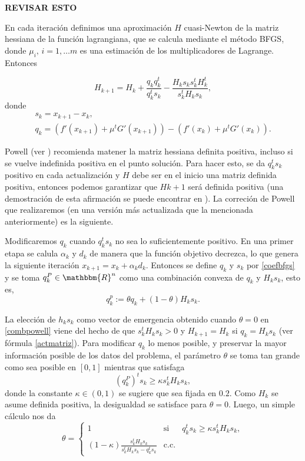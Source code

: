 \documentclass[a4paper,10pt]{book}
\newcommand{\R}{\mathbbm{R}}
\newcommand{\Rn}{\R^n}
\begin{document}
\textbf{REVISAR ESTO}

En cada iteración definimos una aproximación $H$ cuasi-Newton de la matriz hessiana de la función lagrangiana, que se calcula mediante el método BFGS, donde $\mu_i,\,i=1,\ldots m$ es una estimación de los multiplicadores de Lagrange. Entonces

\begin{equation}\label{actmatriz}
    H_{k+1}=H_k+\frac{q_kq_k^t}{q_k^ts_k}-\frac{H_ks_ks_k^tH_k^t}{s_k^tH_ks_k},
\end{equation}
donde 
\begin{equation}\label{coefbfgs}
    \begin{array}{c}
    s_k=x_{k+1}-x_k,\\
    q_k=\left(f'(x_{k+1})+\mu^tG'(x_{k+1})\right)-\left( f'(x_k)+\mu^tG'(x_k)\right).
    \end{array}
\end{equation}

Powell (ver \cite{powell1978fast}) recomienda matener la matriz hessiana definita positiva, incluso si se vuelve indefinida positiva en el punto solución. Para hacer esto, se da $q_k^ts_k$ positivo en cada actualización y $H$ debe ser en el inicio una matriz definida positiva, entonces podemos garantizar que $H{k+1}$ será definida positiva (una demostración de esta afirmación se puede encontrar en \cite[Theorem 4.5.]{bonnans2006numerical}). La correción de Powell que realizaremos (en una versión más actualizada que la mencionada anteriormente) es la siguiente.

Modificaremos $q_k$ cuando $q_k^ts_k$ no sea lo suficientemente positivo. En una primer etapa se calula $\alpha_k$ y $d_k$ de manera que la función objetivo decrezca, lo que genera la siguiente iteración $x_{k+1}=x_k+\alpha_kd_k$. Entonces se define $q_k$ y $s_k$ por \eqref{coefbfgs} y se toma $q_k^P\in\Rn$ como una combinación convexa de $q_k$ y $H_ks_k$, esto es,
\begin{equation}\label{combpowell}
    q_k^p:=\theta q_k+(1-\theta)H_ks_k.
\end{equation}

La elección de $h_ks_k$ como vector de emergencia obtenido cuando $\theta=0$ en \eqref{combpowell} viene del hecho de que $s_k^tH_ks_k>0$ y $H_{k+1}=H_k$ si $q_k=H_ks_k$ (ver fórmula \eqref{actmatriz}). Para modificar $q_k$ lo menos posible, y preservar la mayor información posible de los datos del problema, el parámetro $\theta$ se toma tan grande como sea posible en $[0,1]$ mientras que satisfaga $$(q_k^P)^ts_k\geq\kappa s_k^tH_ks_k,$$ donde la constante $\kappa\in (0,1)$ se sugiere que sea fijada en $0.2$. Como $H_k$ se asume definida positiva, la desigualdad se satisface para $\theta=0$. Luego, un simple cálculo nos da
\begin{equation*}
    \theta=\left\{
    \begin{array}{rcl}
    1&\mbox{si}&q_k^ts_k\geq\kappa s_k^tH_ks_k,\\
    (1-\kappa)\frac{s_k^tH_ks_k}{s_k^tH_ks_k-q_k^ts_k}&\mbox{c.c}.
    \end{array}
    \right.
\end{equation*}
\end{document}
